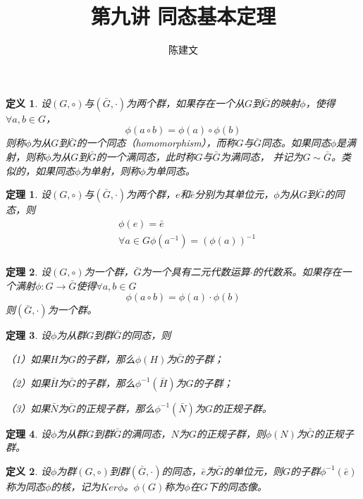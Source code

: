 \documentclass{article}
\newtheorem{Def}{定义}
\newtheorem{Thm}{定理}
\begin{document}
\begin{CJK*}{UTF8}{gbsn}
  \title{第九讲 同态基本定理}
  \author{陈建文}
  \maketitle
  

\begin{Def}
  设$(G,\circ)$与$(\bar{G},\cdot)$为两个群，如果存在一个从$G$到$\bar{G}$的映射$\phi$，使得$\forall a,b\in G$，\[\phi(a\circ b)=\phi(a)\circ \phi(b)\]
  则称$\phi$为从$G$到$\bar{G}$的一个同态（homomorphism），而称$G$与$\bar{G}$同态。如果同态$\phi$是满射，则称$\phi$为从$G$到$\bar{G}$的一个满同态，此时称$G$与$\bar{G}$为满同态，
  并记为$G\sim \bar{G}$。类似的，如果同态$\phi$为单射，则称$\phi$为单同态。
\end{Def}

\begin{Thm}
  设$(G,\circ)$与$(\bar{G},\cdot)$为两个群，$e$和$\bar{e}$分别为其单位元，$\phi$为从$G$到$\bar{G}$的同态，则
  \begin{align*}
    &\phi(e)=\bar{e}\\
    &\forall a\in G \phi(a^{-1})=(\phi(a))^{-1}\\
  \end{align*}
\end{Thm}

\begin{Thm}
  设$(G,\circ)$为一个群，$\bar{G}$为一个具有二元代数运算$\cdot$的代数系。如果存在一个满射$\phi:G\to \bar{G}$使得$\forall a,b\in G$
  \[\phi(a\circ b)=\phi(a) \cdot \phi(b)\]
  则$(\bar{G},\cdot)$为一个群。
\end{Thm}

\begin{Thm}
  设$\phi$为从群$G$到群$\bar{G}$的同态，则

  （1）如果$H$为$G$的子群，那么$\phi(H)$为$\bar{G}$的子群；

  （2）如果$\bar{H}$为$\bar{G}$的子群，那么$\phi^{-1}(\bar{H})$为$G$的子群；

  （3）如果$\bar{N}$为$\bar{G}$的正规子群，那么$\phi^{-1}(\bar{N})$为$G$的正规子群。
\end{Thm}

\begin{Thm}
设$\phi$为从群$G$到群$\bar{G}$的满同态，$N$为$G$的正规子群，则$\phi(N)$为$\bar{G}$的正规子群。
\end{Thm}

\begin{Def}
设$\phi$为群$(G,\circ)$到群$(\bar{G},\cdot)$的同态，$\bar{e}$为$\bar{G}$的单位元，则$G$的子群$\phi^{-1}(\bar{e})$称为同态$\phi$的核，记为$Ker \phi$。$\phi(G)$称为$\phi$在$G$下的同态像。
\end{Def}


\end{CJK*}
\end{document}
